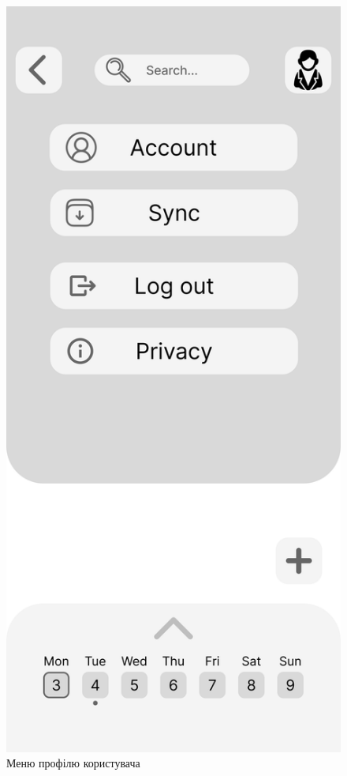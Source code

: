\documentclass[oneside,14pt]{extarticle}
\begin{document}
\begin{normalsize}
	\begin{figure}[H]
		\begin{minipage}{0.48\textwidth}
			\centering
			\includegraphics[scale=0.13]{Frame 5}
			\caption{Меню профілю користувача}

\end{minipage}
\end{figure}
\end{normalsize}
\end{document}
